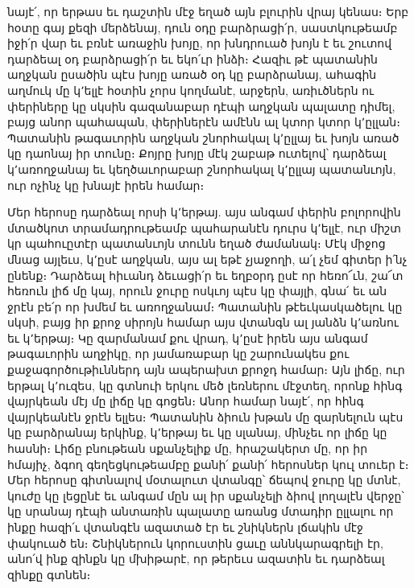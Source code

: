 \documentclass{article}
\begin{document}
{նայէ՛, որ երթաս եւ դաշտին մէջ եղած այն բլուրին վրայ կենաս։ Երբ հօտը գայ քեզի մերձենայ, դուն օդը բարձրացի՛ր, սաստկութեամբ իջի՛ր վար եւ բռնէ առաջին խոյը, որ խնդրուած խոյն է եւ շուտով դարձեալ օդ բարձրացի՛ր եւ եկո՛ւր ինձի։ Հազիւ թէ պատանին աղջկան ըսածին պէս խոյը առած օդ կը բարձրանայ, ահագին աղմուկ մը կ՚ելլէ հօտին չորս կողմանէ, արջերն, առիւծներն ու փերիները կը սկսին գազանաբար դէպի աղջկան պալատը դիմել, բայց անոր պահապան, փերիներէն ամէնն ալ կտոր կտոր կ՚ըլլան։ Պատանին թագաւորին աղջկան շնորհակալ կ՚ըլլայ եւ խոյն առած կը դաոնայ իր տունը։ Քոյրը խոյը մէկ շաբաթ ուտելով՝ դարձեալ կ՚առողջանայ եւ կեղծաւորաբար շնորհակալ կ՚ըլլայ պատանւոյն, ուր ոչինչ կը խնայէ իրեն համար։

Մեր հերոսը դարձեալ որսի կ՚երթայ. այս անգամ փերին բոլորովին մտածկոտ տրամադրութեամբ պահարանէն դուրս կ՚ելլէ, ուր միշտ կր պահուըտէր պատանւոյն տունն եղած ժամանակ։ Մէկ միջոց մնաց այլեւս, կ՚ըսէ աղջկան, այս ալ եթէ չյաջողի, ա՛լ չեմ գիտեր ի՛նչ ընենք։ Դարձեալ հիւանդ ձեւացի՛ր եւ եղբօրդ ըսէ որ հեռո՜ւն, շա՜տ հեռուն լիճ մը կայ, որուն ջուրը ոսկւոյ պէս կը փայլի, գնա՛ եւ ան ջրէն բե՛ր որ խմեմ եւ առողջանամ։ Պատանին թէեւկասկածելու կը սկսի, բայց իր քրոջ սիրոյն համար այս վտանգն ալ յանձն կ՚առնու եւ կ՚երթայ։ Կը զարմանամ քու վրադ, կ՚ըսէ իրեն այս անգամ թագաւորին աղջիկը, որ յամառաբար կը շարունակես քու քաջագործութիւններդ այն ապերախտ քրոջդ համար։ Այն լիճը, ուր երթալ կ՚ուզես, կը գտնուի երկու մեծ լեռներու մէջտեղ, որոնք հինգ վայրկեան մէյ մը լիճը կը գոցեն։ Անոր համար նայէ՛, որ հինգ վայրկեանէն ջրէն ելլես։ Պատանին ձիուն խթան մը զարնելուն պէս կը բարձրանայ երկինք, կ՚երթայ եւ կը սլանայ, մինչեւ որ լիճը կը հասնի։ Լիճը բնութեան սքանչելիք մը, հրաշակերտ մը, որ իր հմայիչ, ձգող գեղեցկութեամբը քանի՛ քանի՛ հերոսներ կուլ տուեր է։ Մեր հերոսը գիտնալով մօտալուտ վտանգը՝ ճեպով ջուրը կը մտնէ, կուժը կը լեցընէ եւ անգամ մըն ալ իր սքանչելի ձիով լողալէն վերջը՝ կը սրանայ դէպի անտառին պալատը առանց մտադիր ըլլալու որ ինքը հազի՛ւ վտանգէն ազատած էր եւ շնիկներն լճակին մէջ փակուած են։ Շնիկներուն կորուստին ցաւը աննկարագրելի էր, անո՛վ ինք զինքն կը մխիթարէ, որ թերեւս ազատին եւ դարձեալ զինքը գտնեն։

}
\end{document}
